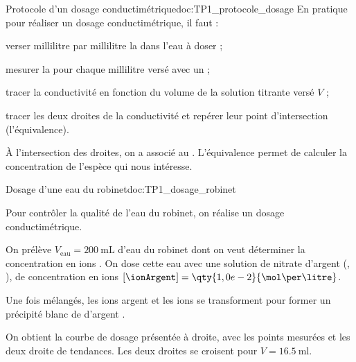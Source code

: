 \begin{doc}{Protocole d'un dosage conductimétrique}{doc:TP1_protocole_dosage}
  En pratique pour réaliser un dosage conductimétrique, il faut :
  \begin{protocole}
    \item verser millilitre par millilitre la  dans l'eau à doser ;
    \item mesurer la  pour chaque millilitre versé avec un  ;
    \item tracer la conductivité en fonction du volume de la solution titrante versé $V$ ;
    \item tracer les deux droites de la conductivité et repérer leur point d'intersection (l'équivalence).
  \end{protocole}

  \vspace*{-10pt}
  \begin{wrapfigure}[2]{r}{0.5\linewidth}
    \hspace*{-60pt}
  \end{wrapfigure}

  \vAligne{-24pt}
  \begin{importants}  
    À l'intersection des droites, on a  associé au .
    L'équivalence permet de calculer la concentration de l'espèce qui nous intéresse.
  \end{importants}
  \vAligne{3.2cm}
  \phantom{b}
\end{doc}

\newpage
\begin{doc}{Dosage d'une eau du robinet}{doc:TP1_dosage_robinet}
  \begin{wrapfigure}{r}{0.4\linewidth}
    \vspace*{-36pt}
    \centering
  \end{wrapfigure}
  Pour contrôler la qualité de l'eau du robinet, on réalise un dosage conductimétrique.

  On prélève $V_\text{eau} = \qty{200}{\mL}$ d'eau du robinet dont on veut déterminer la concentration en ions  \chlorure.
  On dose cette eau avec une solution de nitrate d'argent (\ionArgent, \nitrate), de concentration en ions $[\ionArgent] = \qty{1,0e-2}{\mol\per\litre}$.

  Une fois mélangés, les ions argent et les ions  se transforment pour former un précipité blanc de  d'argent \chlorureDArgent.

  On obtient la courbe de dosage présentée à droite, avec les points mesurées et les deux droite de tendances.
  Les deux droites se croisent pour $V = \qty{16,5}{\ml}$.
\end{doc}

